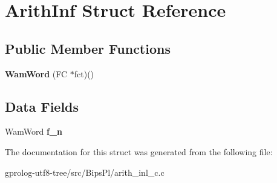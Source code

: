 \hypertarget{structArithInf}{}\section{Arith\+Inf Struct Reference}
\label{structArithInf}
\subsection*{Public Member Functions}
\begin{DoxyCompactItemize}
\item 
{\bfseries Wam\+Word} (FC $\ast$fct)()\hypertarget{structArithInf_a436fe064b4148705eda3a2a3ed99b067}{}\label{structArithInf_a436fe064b4148705eda3a2a3ed99b067}

\end{DoxyCompactItemize}
\subsection*{Data Fields}
\begin{DoxyCompactItemize}
\item 
Wam\+Word {\bfseries f\+\_\+n}\hypertarget{structArithInf_a0adf57977998badbf4fa7d8386fd5bdc}{}\label{structArithInf_a0adf57977998badbf4fa7d8386fd5bdc}

\end{DoxyCompactItemize}


The documentation for this struct was generated from the following file\+:\begin{DoxyCompactItemize}
\item 
gprolog-\/utf8-\/tree/src/\+Bips\+Pl/arith\+\_\+inl\+\_\+c.\+c\end{DoxyCompactItemize}
